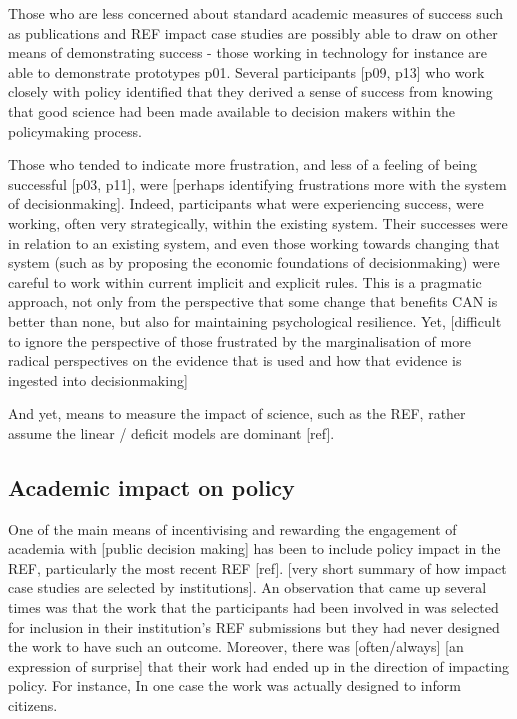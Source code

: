Those who are less concerned about standard academic measures of success such as publications and REF impact case studies are possibly able to draw on other means of demonstrating success - those working in technology for instance are able to demonstrate prototypes p01. Several participants [p09, p13] who work closely with policy identified that they derived a sense of success from knowing that good science had been made available to decision makers within the policymaking process.

Those who tended to indicate more frustration, and less of a feeling of being successful [p03, p11], were [perhaps identifying frustrations more with the system of decisionmaking]. Indeed, participants what were experiencing success, were working, often very strategically, within the existing system. Their successes were in relation to an existing system, and even those working towards changing that system (such as by proposing the economic foundations of decisionmaking) were careful to work within current implicit and explicit rules. This is a pragmatic approach, not only from the perspective that some change that benefits CAN is better than none, but also for maintaining psychological resilience. Yet, [difficult to ignore the perspective of those frustrated by the marginalisation of more radical perspectives on the evidence that is used and how that evidence is ingested into decisionmaking]  


And yet, means to measure the impact of science, such as the REF, rather assume the linear / deficit models are dominant [ref]. 



\subsection{Academic impact on policy}
One of the main means of incentivising and rewarding the engagement of academia with [public decision making] has been to include policy impact in the REF, particularly the most recent REF [ref]. [very short summary of how impact case studies are selected by institutions]. An observation that came up several times was that the work that the participants had been involved in was selected for inclusion in their institution's REF submissions but they had never designed the work to have such an outcome. Moreover, there was [often/always] [an expression of surprise] that their work had ended up in the direction of impacting policy. For instance, In one case the work was actually designed to inform citizens. 

